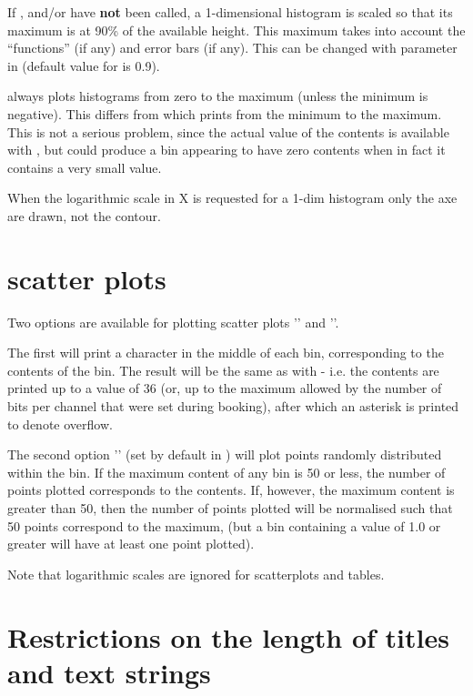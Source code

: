 If ,  and/or  have {\bf  not} been 
called, a 1-dimensional histogram is scaled so that its maximum is at 90\% of 
the available height. This maximum takes into account the  
``functions'' (if any) and error bars (if any). This can be changed with 
parameter  in  (default value for  is 0.9).

\HPLOT{} always plots histograms from zero to the maximum (unless the minimum is
negative). This differs from \HBOOK{} which prints from the minimum to the 
maximum. This is not a serious problem, since the actual value of the contents 
is available with \HBOOK, but \HPLOT{} could produce a bin appearing to have 
zero contents when in fact it contains a very small value.

When the logarithmic scale in X is requested for a 1-dim histogram only the axe 
are drawn, not the contour.

\section{\HPLOT{} scatter plots}

Two options are available for plotting scatter plots '' and 
''.

The first will print a character in the middle of each bin, corresponding to the
contents of the bin. The result will be the same as with \HBOOK{} - i.e. the
contents are printed up to a value of 36 (or, up to the maximum allowed by the
number of bits per channel that were set during booking), after which an 
asterisk is printed to denote overflow.

The second option '' (set by default in ) will plot 
points randomly distributed within the bin. If the maximum content of any bin is
50 or less, the number of points plotted corresponds to the contents. If, 
however, the maximum content is greater than 50, then the number of points 
plotted will be normalised such that 50 points correspond to the maximum, 
(but a bin containing a value of 1.0 or greater will have at least one point 
plotted).

Note that logarithmic scales are ignored for scatterplots and tables.

\section{Restrictions on the length of titles and text strings}

